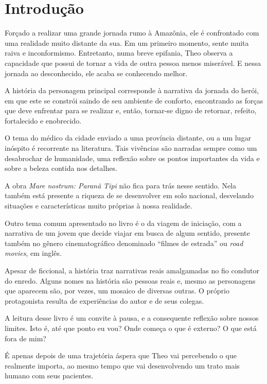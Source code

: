 \documentclass[12pt]{extarticle}
\begin{document}
\hspace{5cm}


\section{Introdução}

Forçado a realizar uma grande jornada rumo à Amazônia, ele é confrontado com
uma realidade muito distante da sua. Em um primeiro momento, sente muita raiva e inconformismo.
Entretanto, numa breve epifania, Theo observa a capacidade que possui de
tornar a vida de outra pessoa menos miserável.
E nessa jornada ao desconhecido, ele acaba se conhecendo melhor.

A história da personagem principal corresponde à narrativa da jornada do herói, em 
que este se constrói saindo de seu ambiente de conforto, encontrando as forças
que deve enfrentar para se realizar e, então, tornar-se digno de retornar, 
refeito, fortalecido e enobrecido.
 
O tema do médico da cidade enviado a uma província distante, ou a um lugar
inóspito é recorrente na literatura.
Tais vivências são narradas sempre como um desabrochar de humanidade, uma
reflexão sobre os pontos importantes da vida e sobre a beleza contida nos
detalhes.

A obra \emph{Mare nostrum: Paranã Tipi} não fica para trás nesse sentido.
Nela também está presente a riqueza de se desenvolver em solo nacional,
desvelando situações e características muito próprias à nossa realidade.
 
Outro tema comum apresentado no livro é o da viagem de iniciação,
com a narrativa de um jovem que decide
viajar em busca de algum sentido, presente também no gênero cinematográfico 
denominado ``filmes de estrada'' ou \textit{road movies}, em inglês.

Apesar de ficcional, a história traz narrativas reais amalgamadas no fio
condutor do enredo.
Alguns nomes na história são pessoas reais e, mesmo as personagens que
aparecem são, por vezes, um mosaico de diversas outras.  
O próprio protagonista resulta de experiências do autor e de seus colegas. 

A leitura desse livro é um convite à pausa, e a consequente reflexão sobre
nossos limites. Isto é, até que ponto eu vou? Onde começa o que é externo? 
O que está fora de mim?

É apenas depois de uma trajetória áspera que Theo vai percebendo o que
realmente importa, ao mesmo tempo que vai desenvolvendo um trato mais humano
com seus pacientes.
\end{document}
